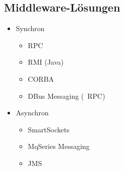 \subsection{Middleware-Lösungen}
\begin{itemize}
    \item Synchron
    \begin{itemize}
        \item RPC
        \item RMI (Java)
        \item CORBA
        \item DBus Messaging (~RPC)
    \end{itemize}
    \item Asynchron
    \begin{itemize}
        \item SmartSockets
        \item MqSeries Messaging
        \item JMS
    \end{itemize}
\end{itemize}
